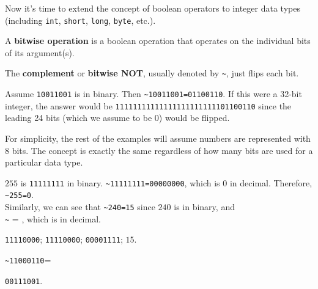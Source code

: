 Now it's time to extend the concept of boolean operators to integer data types (including
\verb+int+, \verb+short+, \verb+long+, \verb+byte+, etc.).

\begin{df}
A {\bf bitwise operation} is a boolean operation that operates on the individual bits of its argument(s).
\end{df}

\begin{df}
The {\bf complement} or {\bf bitwise NOT}, usually denoted by \verb+~+, just flips each bit.
\end{df}

\begin{exa}
Assume \verb+10011001+ is in binary.  Then  
\verb+~10011001=01100110+. 
If this were a 32-bit integer, the answer would be
\verb+11111111111111111111111101100110+ since the leading 24 bits (which we assume to be $0$) 
would be flipped.  
\end{exa}

\begin{rem}
For simplicity, the rest of the examples will assume numbers are represented with 8 bits.
The concept is exactly the same regardless of how many bits are used for a particular data type.
\end{rem}

\begin{fib}
$255$ is \verb+11111111+ in binary. 
\verb+~11111111=00000000+, which is $0$ in decimal. 
Therefore, \verb+~255=0+.\\
Similarly, we can see that \verb+~240=15+ since $240$ is  in binary, and\\
\verb+~+ = , which is  in decimal.
\begin{answer}
\verb+11110000+; \verb+11110000+; \verb+00001111+; $15$.
\end{answer}
\end{fib}

\begin{exer}
\verb+~11000110+=
\begin{answer}
\verb+00111001+.
\end{answer}
\end{exer}



